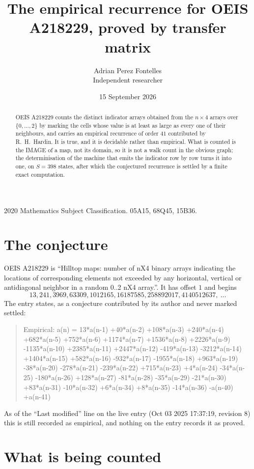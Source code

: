 \documentclass[11pt,a4paper]{article}
\title{The empirical recurrence for OEIS A218229, proved by transfer matrix}
\author{Adrian Perez Fontelles\\ \small Independent researcher}
\date{15 September 2026}
\theoremstyle{plain}
\theoremstyle{definition}
\begin{document}
\maketitle

\begin{abstract}
OEIS A218229 counts the distinct indicator arrays obtained from the $n\times4$ arrays over
$\{0,\dots,2\}$ by marking the cells whose value is at least as large as every one of their neighbours, and carries an
empirical recurrence of order $41$ contributed by R.~H.~Hardin. It is true, and it is
decidable rather than empirical. What is counted is the IMAGE of a map, not its domain, so it
is not a walk count in the obvious graph; the determinisation of the machine that emits the
indicator row by row turns it into one, on $S=398$ states, after which the conjectured
recurrence is settled by a finite exact computation.
\end{abstract}

\noindent\small 2020 Mathematics Subject Classification. 05A15, 68Q45, 15B36.\normalsize

\section{The conjecture}

OEIS A218229 is ``Hilltop maps: number of nX4 binary arrays indicating the locations of corresponding elements not exceeded by any horizontal, vertical or antidiagonal neighbor in a random 0..2 nX4 array.''. It has offset $1$ and begins
\[
13, 241, 3969, 63309, 1012165, 16187585, 258892017, 4140512637,\ \dots
\]
The entry states, as a conjecture contributed by its author and never marked settled:
\begin{quote}
Empirical: a(n) = 13*a(n-1) +40*a(n-2) +108*a(n-3) +240*a(n-4) +682*a(n-5) +752*a(n-6) +1174*a(n-7) +1536*a(n-8) +2226*a(n-9) -1135*a(n-10) +2385*a(n-11) +2447*a(n-12) -419*a(n-13) -3212*a(n-14) +1404*a(n-15) +582*a(n-16) -932*a(n-17) -1955*a(n-18) +963*a(n-19) -38*a(n-20) -278*a(n-21) -239*a(n-22) +715*a(n-23) +4*a(n-24) -34*a(n-25) -180*a(n-26) +128*a(n-27) -81*a(n-28) -35*a(n-29) -21*a(n-30) +83*a(n-31) -10*a(n-32) +6*a(n-34) +8*a(n-35) -14*a(n-36) -a(n-40) +a(n-41)
\end{quote}
As of the ``Last modified'' line on the live entry (Oct 03 2025 17:37:19, revision 8) this is still
recorded as empirical, and nothing on the entry records it as proved.

\section{What is being counted}
\end{document}
